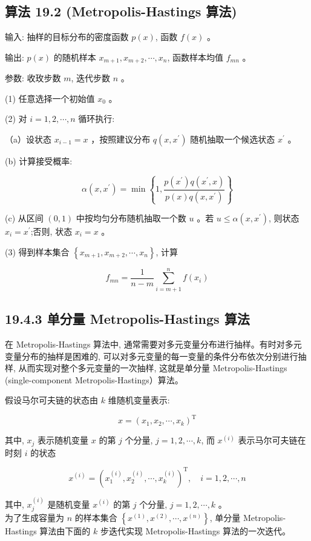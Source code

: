 \documentclass[10pt]{article}
\begin{document}
\begin{CJK*}{UTF8}{bsmi}
\section*{算法 19.2 (Metropolis-Hastings 算法)}
输入: 抽样的目标分布的密度函数 $p(x)$, 函数 $f(x)$ 。

输出: $p(x)$ 的随机样本 $x_{m+1}, x_{m+2}, \cdots, x_{n}$, 函数样本均值 $f_{m n}$ 。

参数: 收玫步数 $m$, 迭代步数 $n$ 。

(1) 任意选择一个初始值 $x_{0}$ 。

(2) 对 $i=1,2, \cdots, n$ 循环执行:

（a）设状态 $x_{i-1}=x$ ，按照建议分布 $q\left(x, x^{\prime}\right)$ 随机抽取一个候选状态 $x^{\prime}$ 。

(b) 计算接受概率:

$$
\alpha\left(x, x^{\prime}\right)=\min \left\{1, \frac{p\left(x^{\prime}\right) q\left(x^{\prime}, x\right)}{p(x) q\left(x, x^{\prime}\right)}\right\}
$$

(c) 从区间 $(0,1)$ 中按均匀分布随机抽取一个数 $u$ 。若 $u \leqslant \alpha\left(x, x^{\prime}\right)$, 则状态 $x_{i}=x^{\prime}$;否则, 状态 $x_{i}=x$ 。

(3) 得到样本集合 $\left\{x_{m+1}, x_{m+2}, \cdots, x_{n}\right\}$, 计算

$$
f_{m n}=\frac{1}{n-m} \sum_{i=m+1}^{n} f\left(x_{i}\right)
$$

\subsection*{19.4.3 单分量 Metropolis-Hastings 算法}
在 Metropolis-Hastings 算法中, 通常需要对多元变量分布进行抽样。有时对多元变量分布的抽样是困难的, 可以对多元变量的每一变量的条件分布依次分别进行抽样, 从而实现对整个多元变量的一次抽样, 这就是单分量 Metropolis-Hastings (single-component Metropolis-Hastings）算法。

假设马尔可夫链的状态由 $k$ 维随机变量表示:

$$
x=\left(x_{1}, x_{2}, \cdots, x_{k}\right)^{\mathrm{T}}
$$

其中, $x_{j}$ 表示随机变量 $x$ 的第 $j$ 个分量, $j=1,2, \cdots, k$, 而 $x^{(i)}$ 表示马尔可夫链在时刻 $i$ 的状态

$$
x^{(i)}=\left(x_{1}^{(i)}, x_{2}^{(i)}, \cdots, x_{k}^{(i)}\right)^{\mathrm{T}}, \quad i=1,2, \cdots, n
$$

其中, $x_{j}^{(i)}$ 是随机变量 $x^{(i)}$ 的第 $j$ 个分量, $j=1,2, \cdots, k$ 。\\
为了生成容量为 $n$ 的样本集合 $\left\{x^{(1)}, x^{(2)}, \cdots, x^{(n)}\right\}$, 单分量 Metropolis-Hastings 算法由下面的 $k$ 步迭代实现 Metropolis-Hastings 算法的一次迭代。


\end{CJK*}
\end{document}
